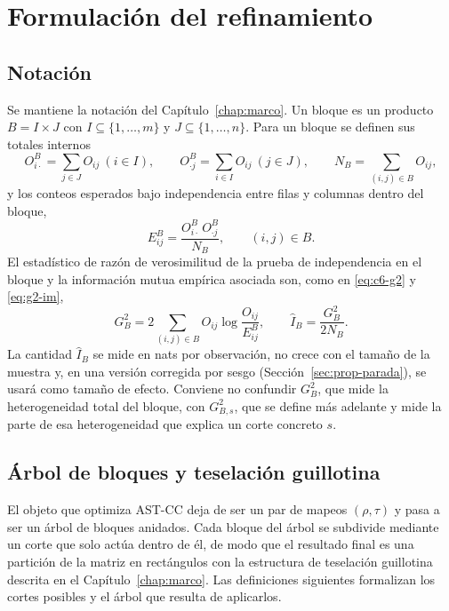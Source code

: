 \section{Formulación del refinamiento}\label{sec:prop-formulacion}

\subsection{Notación}

Se mantiene la notación del Capítulo~\ref{chap:marco}. Un bloque es un
producto $B = I \times J$ con $I \subseteq \{1,\dots,m\}$ y
$J \subseteq \{1,\dots,n\}$. Para un bloque se definen sus totales internos
\[
  O^{B}_{i\cdot} = \sum_{j\in J} O_{ij}\ (i\in I), \qquad
  O^{B}_{\cdot j} = \sum_{i\in I} O_{ij}\ (j\in J), \qquad
  N_B = \sum_{(i,j)\in B} O_{ij},
\]
y los conteos esperados bajo independencia entre filas y columnas dentro del
bloque,
\begin{equation}\label{eq:prop-EB}
  E^{B}_{ij} = \frac{O^{B}_{i\cdot}\, O^{B}_{\cdot j}}{N_B},
  \qquad (i,j)\in B .
\end{equation}
El estadístico de razón de verosimilitud de la prueba de independencia en el
bloque y la información mutua empírica asociada son, como en
\eqref{eq:c6-g2} y \eqref{eq:g2-im},
\begin{equation}\label{eq:prop-G2}
  G^2_B = 2\sum_{(i,j)\in B} O_{ij}\log\frac{O_{ij}}{E^{B}_{ij}},
  \qquad
  \hat I_B = \frac{G^2_B}{2N_B}.
\end{equation}
La cantidad $\hat I_B$ se mide en nats por observación, no crece con el
tamaño de la muestra y, en una versión corregida por sesgo
(Sección~\ref{sec:prop-parada}), se usará como tamaño de efecto. Conviene no
confundir $G^2_B$, que mide la heterogeneidad total del bloque, con $G^2_{B,s}$,
que se define más adelante y mide la parte de esa heterogeneidad que explica un
corte concreto $s$.

\subsection{Árbol de bloques y teselación guillotina}

El objeto que optimiza AST-CC deja de ser un par de mapeos $(\rho,\tau)$ y pasa
a ser un árbol de bloques anidados. Cada bloque del árbol se subdivide mediante un
corte que solo actúa dentro de él, de modo que el resultado final es una partición
de la matriz en rectángulos con la estructura de teselación guillotina descrita en
el Capítulo~\ref{chap:marco}. Las definiciones siguientes formalizan los cortes
posibles y el árbol que resulta de aplicarlos.

